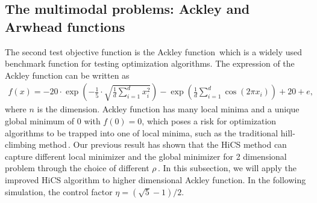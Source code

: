 \documentclass[final,1p,times]{elsarticle}
\begin{document}

\subsection{The multimodal problems: Ackley and Arwhead functions}
\label{subsec:minmulit}

The second test objective function is the Ackley
function\,\cite{dieterich2012empirical} which is a widely used 
benchmark function for testing optimization algorithms.
The expression of the Ackley function can be written as
\begin{align}
	f(x) =
	-20\cdot\exp\left(-\frac{1}{5}\cdot\sqrt{\frac{1}{d}\sum_{i=1}^d
	x_i^2}\right)-
	\exp\left(\frac{1}{d}\sum_{i=1}^d \cos(2\pi x_i)\right)+20+e,
	\label{eqn:ackley}
\end{align}
where $n$ is the dimension.
Ackley function has many local minima and a unique global
minimum of $0$ with $f(0)=0$, which poses a risk for
optimization algorithms to be trapped into one of local
minima, such as the traditional hill-climbing method\,\cite{back1996evolutionary}.
Our previous result has shown that the HiCS method can capture
different local minimizer and the global minimizer for 2
dimensional problem through the choice of different $\rho$\,\cite{huang2017hill}.
In this subsection, we will apply the improved HiCS
algorithm to higher dimensional Ackley function. 
In the following simulation, the control factor
$\eta=(\sqrt{5}-1)/2$.
\end{document}
